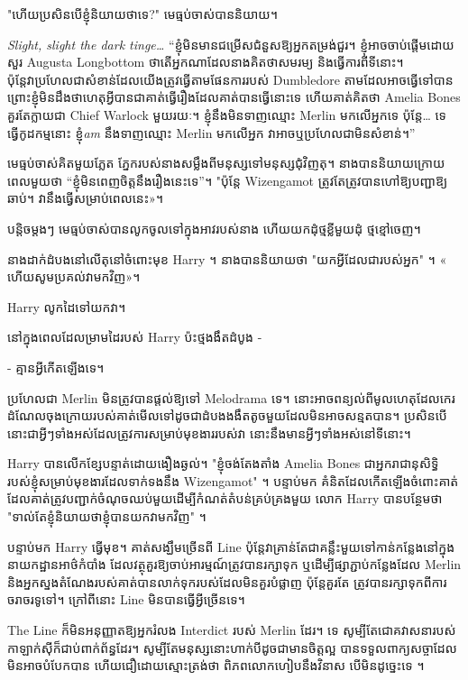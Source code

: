 "ហើយប្រសិនបើខ្ញុំនិយាយថាទេ?" មេធ្មប់ចាស់បាននិយាយ។

\emph{Slight, slight the dark tinge…} “ខ្ញុំ​មិន​មាន​ជម្រើស​ជំនួស​ឱ្យ​អ្នក​តម្រង់​ជួរ​។ ខ្ញុំអាចចាប់ផ្តើមដោយសួរ Augusta Longbottom ថាតើអ្នកណាដែលនាងគិតថាសមរម្យ និងធ្វើការពីទីនោះ។ ប៉ុន្តែវាប្រហែលជាសំខាន់ដែលយើងត្រូវធ្វើតាមផែនការរបស់ Dumbledore តាមដែលអាចធ្វើទៅបាន ព្រោះខ្ញុំមិនដឹងថាហេតុអ្វីបានជាគាត់ធ្វើរឿងដែលគាត់បានធ្វើនោះទេ ហើយគាត់គិតថា Amelia Bones គួរតែក្លាយជា Chief Warlock មួយរយៈ។ ខ្ញុំនឹងមិនទាញឈ្មោះ Merlin មកលើអ្នកទេ ប៉ុន្តែ… ទេ ធ្វើកូដកម្មនោះ ខ្ញុំ\emph{am} នឹងទាញឈ្មោះ Merlin មកលើអ្នក វាអាចឬប្រហែលជាមិនសំខាន់។”

មេធ្មប់ចាស់គិតមួយភ្លែត ភ្នែករបស់នាងសម្លឹងពីមនុស្សទៅមនុស្សជុំវិញតុ។ នាង​បាន​និយាយ​ក្រោយ​ពេល​មួយ​ថា “ខ្ញុំ​មិន​ពេញ​ចិត្ត​នឹង​រឿង​នេះ​ទេ”។ "ប៉ុន្តែ Wizengamot ត្រូវតែត្រូវបានហៅឱ្យបញ្ជាឱ្យឆាប់។ វា​នឹង​ធ្វើ​សម្រាប់​ពេល​នេះ»។

បន្តិចម្ដងៗ មេធ្មប់ចាស់បានលូកចូលទៅក្នុងអាវរបស់នាង ហើយយកដុំថ្មខ្លីមួយដុំ ថ្មខ្មៅចេញ។

នាងដាក់ដំបងនៅលើតុនៅចំពោះមុខ Harry ។ នាងបាននិយាយថា "យកអ្វីដែលជារបស់អ្នក" ។ «​ហើយ​សូម​ប្រគល់​វា​មក​វិញ»។

Harry លូកដៃទៅយកវា។

នៅក្នុងពេលដែលម្រាមដៃរបស់ Harry ប៉ះថ្មងងឹតដំបូង -

- គ្មានអ្វីកើតឡើងទេ។

ប្រហែលជា Merlin មិនត្រូវបានផ្តល់ឱ្យទៅ Melodrama ទេ។ នោះអាចពន្យល់ពីមូលហេតុដែលកេរដំណែលចុងក្រោយរបស់គាត់មើលទៅដូចជាដំបងងងឹតតូចមួយដែលមិនអាចសន្មតបាន។ ប្រសិនបើនោះជាអ្វីៗទាំងអស់ដែលត្រូវការសម្រាប់មុខងាររបស់វា នោះនឹងមានអ្វីៗទាំងអស់នៅទីនោះ។

Harry បានលើកខ្សែបន្ទាត់ដោយងឿងឆ្ងល់។ "ខ្ញុំចង់តែងតាំង Amelia Bones ជាអ្នករាជានុសិទ្ធិរបស់ខ្ញុំសម្រាប់មុខងារដែលទាក់ទងនឹង Wizengamot" ។ បន្ទាប់មក គំនិតដែលកើតឡើងចំពោះគាត់ដែលគាត់ត្រូវបញ្ជាក់ចំណុចឈប់មួយដើម្បីកំណត់តំបន់គ្រប់គ្រងមួយ លោក Harry បានបន្ថែមថា "ទាល់តែខ្ញុំនិយាយថាខ្ញុំបានយកវាមកវិញ" ។

បន្ទាប់មក Harry ធ្វើមុខ។ គាត់សង្ឃឹមច្រើនពី Line ប៉ុន្តែវាគ្រាន់តែជាគន្លឹះមួយទៅកាន់កន្លែងនៅក្នុងនាយកដ្ឋានអាថ៌កំបាំង ដែលវត្ថុគួរឱ្យចាប់អារម្មណ៍ត្រូវបានរក្សាទុក ឬដើម្បីផ្សាភ្ជាប់កន្លែងដែល Merlin និងអ្នកស្នងតំណែងរបស់គាត់បានលាក់ទុករបស់ដែលមិនគួរបំផ្លាញ ប៉ុន្តែគួរតែ ត្រូវបានរក្សាទុកពីការចរាចរទូទៅ។ ក្រៅ​ពី​នោះ Line មិន​បាន​ធ្វើ​អ្វី​ច្រើន​ទេ។

The Line ក៏មិនអនុញ្ញាតឱ្យអ្នករំលង Interdict របស់ Merlin ដែរ។ ទេ សូម្បីតែជោគវាសនារបស់កាឡាក់ស៊ីក៏ជាប់ពាក់ព័ន្ធដែរ។ សូម្បីតែមនុស្សនោះហាក់បីដូចជាមានចិត្តល្អ បានទទួលពាក្យសច្ចាដែលមិនអាចបំបែកបាន ហើយជឿដោយស្មោះត្រង់ថា ពិភពលោកហៀបនឹងវិនាស បើមិនដូច្នេះទេ ។

